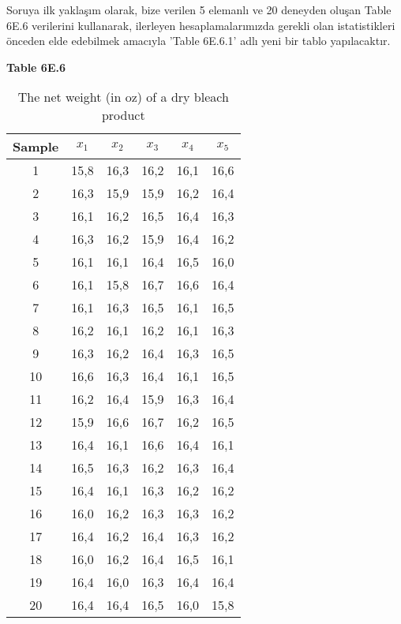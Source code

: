 	Soruya ilk yaklaşım olarak, bize verilen 5 elemanlı ve 20 deneyden oluşan Table 6E.6 verilerini kullanarak, ilerleyen hesaplamalarımızda gerekli olan istatistikleri önceden elde edebilmek amacıyla 'Table 6E.6.1' adlı yeni bir tablo yapılacaktır.
	
	\renewcommand{\arraystretch}{1}
	
	\begin{table}[h!]
		\centering
		\caption*{\bfseries Table 6E.6}
		\begin{tabular}{|c|c|c|c|c|c|}
			\hline
			\textbf{Sample} & \textbf{$x_1$} & \textbf{$x_2$} & \textbf{$x_3$} & \textbf{$x_4$} & \textbf{$x_5$} \\ \hline
			1 & 15,8 & 16,3 & 16,2 & 16,1 & 16,6 \\ \hline
			2 & 16,3 & 15,9 & 15,9 & 16,2 & 16,4 \\ \hline
			3 & 16,1 & 16,2 & 16,5 & 16,4 & 16,3 \\ \hline
			4 & 16,3 & 16,2 & 15,9 & 16,4 & 16,2 \\ \hline
			5 & 16,1 & 16,1 & 16,4 & 16,5 & 16,0 \\ \hline
			6 & 16,1 & 15,8 & 16,7 & 16,6 & 16,4 \\ \hline
			7 & 16,1 & 16,3 & 16,5 & 16,1 & 16,5 \\ \hline
			8 & 16,2 & 16,1 & 16,2 & 16,1 & 16,3 \\ \hline
			9 & 16,3 & 16,2 & 16,4 & 16,3 & 16,5 \\ \hline
			10 & 16,6 & 16,3 & 16,4 & 16,1 & 16,5 \\ \hline
			11 & 16,2 & 16,4 & 15,9 & 16,3 & 16,4 \\ \hline
			12 & 15,9 & 16,6 & 16,7 & 16,2 & 16,5 \\ \hline
			13 & 16,4 & 16,1 & 16,6 & 16,4 & 16,1 \\ \hline
			14 & 16,5 & 16,3 & 16,2 & 16,3 & 16,4 \\ \hline
			15 & 16,4 & 16,1 & 16,3 & 16,2 & 16,2 \\ \hline
			16 & 16,0 & 16,2 & 16,3 & 16,3 & 16,2 \\ \hline
			17 & 16,4 & 16,2 & 16,4 & 16,3 & 16,2 \\ \hline
			18 & 16,0 & 16,2 & 16,4 & 16,5 & 16,1 \\ \hline
			19 & 16,4 & 16,0 & 16,3 & 16,4 & 16,4 \\ \hline
			20 & 16,4 & 16,4 & 16,5 & 16,0 & 15,8 \\ \hline
		\end{tabular}
		\caption*{The net weight (in oz) of a dry bleach product}
		\label{tab:sample-data}
	\end{table}
	
